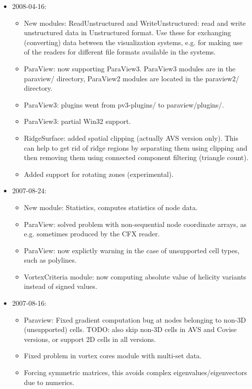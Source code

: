 \begin{itemize}
\item
  2008-04-16:
  \begin{itemize}
  \item
    New modules: ReadUnstructured and WriteUnstructured: read and write unstructured data in Unstructured format. Use these for exchanging (converting) data between the visualization systems, e.g. for making use of the readers for different file formats available in the systems.
  \item
    ParaView: now supporting ParaView3. ParaView3 modules are in the paraview/ directory, ParaView2 modules are located in the paraview2/ directory.
  \item
    ParaView3: plugins went from pv3-plugins/ to paraview/plugins/.
  \item
    ParaView3: partial Win32 support.
  \item
    RidgeSurface: added spatial clipping (actually AVS version only). This can help to get rid of ridge regions by separating them using clipping and then removing them using connected component filtering (triangle count).
  \item
    Added support for rotating zones (experimental).
  \end{itemize}

\item
  2007-08-24:
  \begin{itemize}
  \item
    New module: Statistics, computes statistics of node data.
  \item
    ParaView: solved problem with non-sequential node coordinate arrays, as e.g. sometimes produced by the CFX reader.
  \item
    ParaView: now explictly warning in the case of unsupported cell types, such as polylines.
  \item
    VortexCriteria module: now computing absolute value of helicity variants instead of signed values.
  \end{itemize}

\item
  2007-08-16:
  \begin{itemize}
  \item
    Paraview: Fixed gradient computation bug at nodes belonging to non-3D (unsupported) cells. TODO: also skip non-3D cells in AVS and Covise versions, or support 2D cells in all versions.
  \item
    Fixed problem in vortex cores module with multi-set data.
  \item
    Forcing symmetric matrices, this avoids complex eigenvalues/eigenvectors due to numerics.
  \end{itemize}


\end{itemize}
